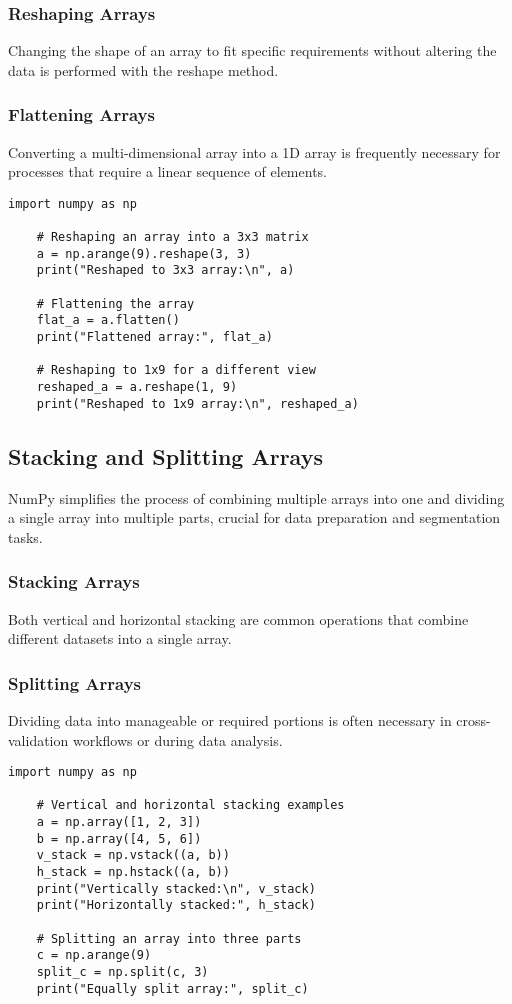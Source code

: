 \subsubsection{Reshaping Arrays}
Changing the shape of an array to fit specific requirements without altering the data is performed with the reshape method.

\subsubsection{Flattening Arrays}
Converting a multi-dimensional array into a 1D array is frequently necessary for processes that require a linear sequence of elements.

\begin{lstlisting}[caption={Example code demonstrating array reshaping and flattening in NumPy}, label={code:numpy-reshape-flatten}, style=pythonstyle]
	import numpy as np
	
	# Reshaping an array into a 3x3 matrix
	a = np.arange(9).reshape(3, 3)
	print("Reshaped to 3x3 array:\n", a)
	
	# Flattening the array
	flat_a = a.flatten()
	print("Flattened array:", flat_a)
	
	# Reshaping to 1x9 for a different view
	reshaped_a = a.reshape(1, 9)
	print("Reshaped to 1x9 array:\n", reshaped_a)
\end{lstlisting}

\subsection{Stacking and Splitting Arrays}
NumPy simplifies the process of combining multiple arrays into one and dividing a single array into multiple parts, crucial for data preparation and segmentation tasks.

\subsubsection{Stacking Arrays}
Both vertical and horizontal stacking are common operations that combine different datasets into a single array.

\subsubsection{Splitting Arrays}
Dividing data into manageable or required portions is often necessary in cross-validation workflows or during data analysis.

\begin{lstlisting}[caption={Example code demonstrating array stacking and splitting in NumPy}, label={code:numpy-stack-split}, style=pythonstyle]
	import numpy as np
	
	# Vertical and horizontal stacking examples
	a = np.array([1, 2, 3])
	b = np.array([4, 5, 6])
	v_stack = np.vstack((a, b))
	h_stack = np.hstack((a, b))
	print("Vertically stacked:\n", v_stack)
	print("Horizontally stacked:", h_stack)
	
	# Splitting an array into three parts
	c = np.arange(9)
	split_c = np.split(c, 3)
	print("Equally split array:", split_c)
\end{lstlisting}

